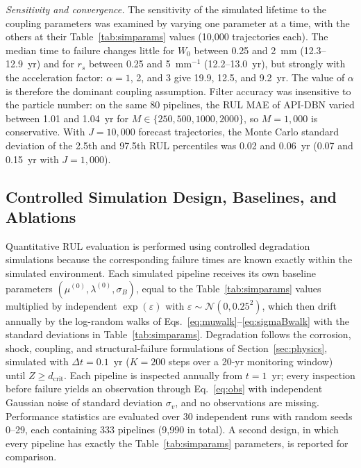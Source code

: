 \documentclass[journal]{IEEEtran}
\begin{document}
\textit{Sensitivity and convergence.}
The sensitivity of the simulated lifetime to the coupling parameters
was examined by varying one parameter at a time, with the others at
their Table~\ref{tab:simparams} values (10{,}000 trajectories each).
The median time to failure changes little for $W_0$ between 0.25 and
2~mm (12.3--12.9~yr) and for $r_s$ between 0.25 and 5~mm$^{-1}$
(12.2--13.0~yr), but strongly with the acceleration factor: $\alpha=1$,
2, and 3 give 19.9, 12.5, and 9.2~yr. The value of $\alpha$ is
therefore the dominant coupling assumption. Filter accuracy was
insensitive to the particle number: on the same 80 pipelines, the RUL
MAE of API-DBN varied between 1.01 and 1.04~yr for
$M\in\{250,500,1000,2000\}$, so $M=1{,}000$ is conservative. With
$J=10{,}000$ forecast trajectories, the Monte Carlo standard deviation
of the 2.5th and 97.5th RUL percentiles was 0.02 and 0.06~yr (0.07 and
0.15~yr with $J=1{,}000$).



\subsection{Controlled Simulation Design, Baselines, and Ablations}
\label{sec:simsetup}

Quantitative RUL evaluation is performed using controlled degradation
simulations because the corresponding failure times are known exactly
within the simulated environment. Each simulated pipeline receives its
own baseline parameters $(\mu^{(0)},\lambda^{(0)},\sigma_B)$, equal to
the Table~\ref{tab:simparams} values multiplied by independent
$\exp(\varepsilon)$ with $\varepsilon\sim\mathcal{N}(0,0.25^2)$, which
then drift annually by the log-random walks of
Eqs.~\eqref{eq:muwalk}--\eqref{eq:sigmaBwalk} with the standard
deviations in Table~\ref{tab:simparams}. Degradation follows the
corrosion, shock, coupling, and structural-failure formulations of
Section~\ref{sec:physics}, simulated with $\Delta t=0.1$~yr ($K=200$
steps over a 20-yr monitoring window) until $Z\ge d_{\mathrm{crit}}$.
Each pipeline is inspected annually from $t=1$~yr; every inspection
before failure yields an observation through Eq.~\eqref{eq:obs} with
independent Gaussian noise of standard deviation $\sigma_v$, and no
observations are missing. Performance statistics are evaluated over 30
independent runs with random seeds 0--29, each containing 333 pipelines
(9{,}990 in total). A second design, in which every pipeline has
exactly the Table~\ref{tab:simparams} parameters, is reported for
comparison.
\end{document}
